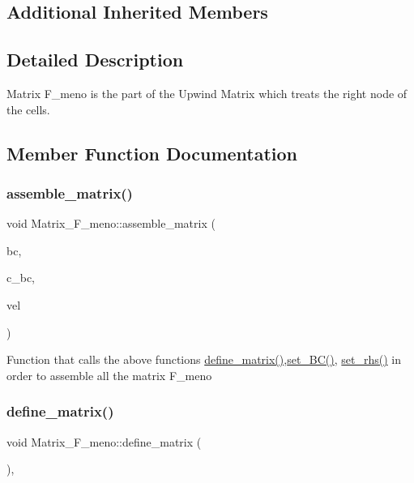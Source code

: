 \subsection*{Additional Inherited Members}


\subsection{Detailed Description}
Matrix F\+\_\+meno is the part of the Upwind Matrix which treats the right node of the cells. 

\subsection{Member Function Documentation}
\mbox{\label{classMatrix__F__meno_a5e4149e92a5c917a79f542859dc0cb7c}} 
\subsubsection{\texorpdfstring{assemble\+\_\+matrix()}{assemble\_matrix()}}
{\footnotesize\ttfamily void Matrix\+\_\+\+F\+\_\+meno\+::assemble\+\_\+matrix (\begin{DoxyParamCaption}\item[{const std\+::string \&}]{bc,  }\item[{double}]{c\+\_\+bc,  }\item[{const Eigen\+::\+Vector\+Xd \&}]{vel }\end{DoxyParamCaption})}

Function that calls the above functions \hyperlink{classMatrix__F__meno_a3b660526da87f63e6091cf4422385d94}{define\+\_\+matrix()},\hyperlink{classMatrix__F__meno_ac8ae0448eb45d2c2996d5cfdb2a587f9}{set\+\_\+\+B\+C()}, \hyperlink{classMatrix__F__meno_adbe40c5bd77fc92b0db81233797276ca}{set\+\_\+rhs()} in order to assemble all the matrix F\+\_\+meno \mbox{\label{classMatrix__F__meno_a3b660526da87f63e6091cf4422385d94}} 
\subsubsection{\texorpdfstring{define\+\_\+matrix()}{define\_matrix()}}
{\footnotesize\ttfamily void Matrix\+\_\+\+F\+\_\+meno\+::define\+\_\+matrix (\begin{DoxyParamCaption}{ }\end{DoxyParamCaption})\hspace{0.3cm}{\ttfamily [override]}, {\ttfamily [virtual]}}

